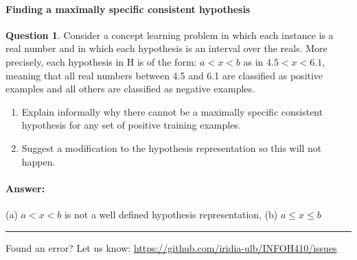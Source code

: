 \documentclass[11pt,a4paper]{article}
\theoremstyle{definition}%
\newtheorem{Q}{Question}[] %
\newcommand{\reponse}[1]{%
\ifthenelse {\boolean{corrige}} {\paragraph{Answer:} \color{darkblue}   #1\color{black}} {}
}
\begin{document}
\paragraph{Finding a maximally specific consistent hypothesis}
\begin{Q}
Consider a concept learning problem in which each instance is a real number and in which
each hypothesis is an interval over the reals. More precisely, each hypothesis in H is of the
form: $a < x < b$ as in $4.5 < x < 6.1$, meaning that all real numbers between 4.5 and 6.1 are
classified as positive examples and all others are classified as negative examples.
\begin{enumerate}
    \item Explain informally why there cannot be a maximally specific consistent hypothesis for
any set of positive training examples.
    \item Suggest a modification to the hypothesis representation so this will not happen.
\end{enumerate}

\reponse{
    (a) $a < x < b$ is not a well defined hypothesis representation,
    (b) $a \leq x \leq b$
}
\end{Q}


\noindent
\rule{\textwidth}{0.4pt}
\footnotesize{Found an error? Let us know: \url{https://github.com/iridia-ulb/INFOH410/issues}}
\end{document}
